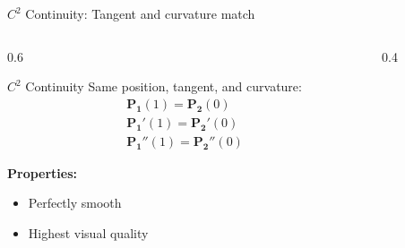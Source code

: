 \begin{frame}{$C^2$ Continuity: Tangent and curvature match}
  \begin{columns}
    \begin{column}{0.6\textwidth}
      \begin{mathbox}{$C^2$ Continuity}
        \small
        Same position, tangent, and curvature:
        \begin{align*}
          \mathbf{P_1}(1) = \mathbf{P_2}(0) \\
          \mathbf{P_1}'(1) = \mathbf{P_2}'(0) \\
          \mathbf{P_1}''(1) = \mathbf{P_2}''(0)
        \end{align*}

        \vspace{0.3cm}

        \textbf{Properties:}

        \begin{itemize}
            \scriptsize
          \item Perfectly smooth
          \item Highest visual quality
        \end{itemize}
      \end{mathbox}
    \end{column}
    \begin{column}{0.4\textwidth}
      \begin{center}
      \end{center}
    \end{column}
  \end{columns}
\end{frame}
